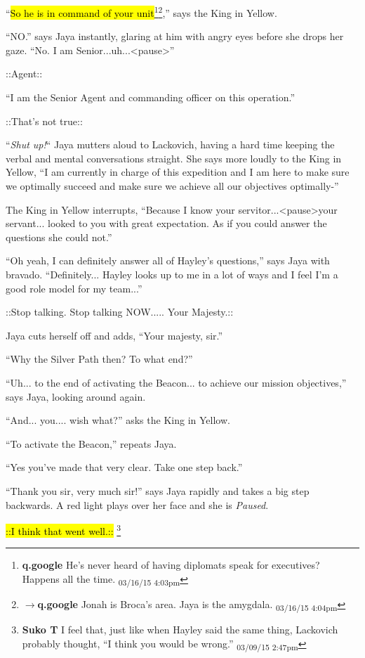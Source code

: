 ``\hl{So he is in command of your unit}\footnote{\textbf{q.google }He's never heard of having diplomats speak for executives?  Happens all the time. \textsubscript{03/16/15 4:03pm}}\footnote{$\rightarrow$\textbf{q.google }Jonah is Broca's area.  Jaya is the amygdala. \textsubscript{03/16/15 4:04pm}},'' says the King in Yellow.

``NO.'' says Jaya instantly, glaring at him with angry eyes before she drops her gaze. ``No. I am Senior...uh...\textless pause\textgreater ''

 {\color[RGB]{74,134,232}::Agent::} 

``I am the Senior Agent and commanding officer on this operation.''

 {\color[RGB]{74,134,232}::That's not true::} 

``\textit{Shut up!}`` Jaya mutters aloud to Lackovich, having a hard time keeping the verbal and mental conversations straight.  She says more loudly to the King in Yellow, ``I am currently in charge of this expedition and I am here to make sure we optimally succeed and make sure we achieve all our objectives optimally-''

The King in Yellow interrupts, ``Because I know your servitor...\textless pause\textgreater  your servant... looked to you with great expectation.  As if you could answer the questions she could not.''

``Oh yeah, I can definitely answer all of Hayley's questions,'' says Jaya with bravado. ``Definitely... Hayley looks up to me in a lot of ways and I feel I'm a good role model for my team...''

 {\color[RGB]{74,134,232}::Stop talking. Stop talking NOW.....  Your Majesty.::} 

Jaya cuts herself off and adds, ``Your majesty, sir.''

``Why the Silver Path then?  To what end?''

``Uh... to the end of activating the Beacon... to achieve our mission objectives,'' says Jaya, looking around again.

``And... you.... wish what?'' asks the King in Yellow.

``To activate the Beacon,'' repeats Jaya.

``Yes you've made that very clear.  Take one step back.''

``Thank you sir, very much sir!'' says Jaya rapidly and takes a big step backwards.  A red light plays over her face and she is \textit{Paused}.

 {\color[RGB]{255,0,0}\hl{::I think that went well.::}} \footnote{\textbf{Suko T }I feel that, just like when Hayley said the same thing, Lackovich probably thought, ``I think you would be wrong.'' \textsubscript{03/09/15 2:47pm}}




